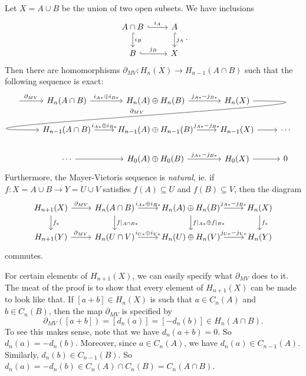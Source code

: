 \documentclass[a4paper]{article}
\begin{document}
\begin{thm}
  Let $X = A \cup B$ be the union of two open subsets. We have inclusions
  \[
    \begin{tikzcd}
      A \cap B \ar[r, "i_A", hook] \ar[d, "i_B", hook] & A \ar[d, hook, "j_A"]\\
      B \ar[r, hook, "j_B"] & X
    \end{tikzcd}.
  \]
  Then there are homomorphisms $\partial_{MV}: H_n(X) \to H_{n - 1}(A \cap B)$ such that the following sequence is exact:
  \[
    \begin{tikzcd}
      \ar[r, "\partial_{MV}"] & H_n(A \cap B) \ar[r, "i_{A*} \oplus i_{B*}"] & H_n(A) \oplus H_n(B) \ar[r, "j_{A*} - j_{B*}"] & H_n(X)\ar[out=0, in=180, looseness=2, overlay, lld, "\partial_{MV}"']\\
      & H_{n - 1}(A \cap B) \ar[r, "i_{A*} \oplus i_{B*}"] & H_{n - 1}(A) \oplus H_{n - 1}(B) \ar[r, "j_{A*} - j_{B*}"] & H_{n - 1}(X) \ar [r] & \cdots\\
      &\cdots \ar[r] & H_0(A) \oplus H_0(B) \ar[r, "j_{A*} - j_{B*}"] & H_0(X) \ar [r] & 0
    \end{tikzcd}
  \]
  Furthermore, the Mayer-Vietoris sequence is \emph{natural}, ie. if $f: X = A\cup B \to Y = U \cup V$ satisfies $f(A) \subseteq U$ and $f(B) \subseteq V$, then the diagram
  \[
    \begin{tikzcd}
       H_{n + 1}(X) \ar[r, "\partial_{MV}"] \ar[d, "f_*"] & H_{n}(A \cap B) \ar[r, "i_{A*} \oplus i_{B*}"] \ar[d, "f|_{A \cap B*}"] & H_n(A) \oplus H_n(B) \ar[r, "j_{A*} - j_{B*}"] \ar[d, "f|_{A*} \oplus f|_{B*}"] & H_n(X) \ar[d, "f_*"]\\
       H_{n + 1}(Y) \ar[r, "\partial_{MV}"] & H_{n}(U \cap V) \ar[r, "i_{U*} \oplus i_{V*}"] & H_n(U) \oplus H_n(V) \ar[r, "j_{U*} - j_{V*}"] & H_n(Y)
    \end{tikzcd}
  \]
  commutes.
\end{thm}
For certain elements of $H_{n + 1}(X)$, we can easily specify what $\partial_{MV}$ does to it. The meat of the proof is to show that every element of $H_{n + 1}(X)$ can be made to look like that. If $[a + b] \in H_n(X)$ is such that $a \in C_n(A)$ and $b \in C_n(B)$, then the map $\partial_{MV}$ is specified by
\[
  \partial_{MV}([a + b]) = [d_n(a)] = [-d_n(b)] \in H_n(A \cap B).
\]
To see this makes sense, note that we have $d_n(a + b) = 0$. So $d_n(a) = - d_n(b)$. Moreover, since $a \in C_n(A)$, we have $d_n(a) \in C_{n - 1}(A)$. Similarly, $d_n(b) \in C_{n - 1}(B)$. So $d_n(a) = - d_n(b) \in C_n(A) \cap C_n(B) = C_n(A \cap B)$.
\end{document}
